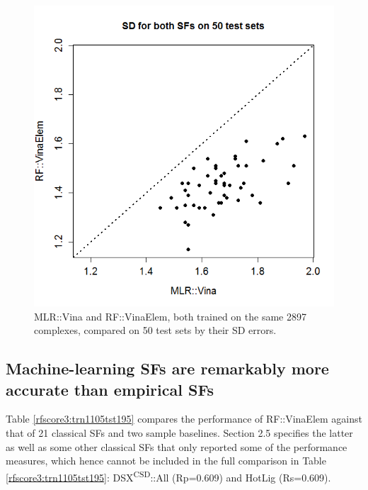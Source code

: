 \begin{figure}
\centering
\includegraphics[width=\linewidth]{../rfscore3/Models24SD.png}
\caption{MLR::Vina and RF::VinaElem, both trained on the same 2897 complexes, compared on 50 test sets by their SD errors.}
\label{rfscore3:Models24SD}
\end{figure}

\subsection{Machine-learning SFs are remarkably more accurate than empirical SFs}

Table \ref{rfscore3:trn1105tst195} compares the performance of RF::VinaElem against that of 21 classical SFs and two sample baselines. Section 2.5 specifies the latter as well as some other classical SFs that only reported some of the performance measures, which hence cannot be included in the full comparison in Table \ref{rfscore3:trn1105tst195}: DSX\textsuperscript{CSD}::All \citep{1460} (Rp=0.609) and HotLig \citep{1459} (Rs=0.609).

